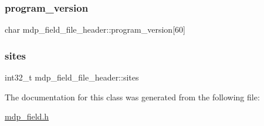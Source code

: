 \subsubsection{\texorpdfstring{program\+\_\+version}{program\_version}}
{\footnotesize\ttfamily char mdp\+\_\+field\+\_\+file\+\_\+header\+::program\+\_\+version\mbox{[}60\mbox{]}}

\mbox{\label{classmdp__field__file__header_a428a51466f48e613f85f9f9875a726bc}} 
\subsubsection{\texorpdfstring{sites}{sites}}
{\footnotesize\ttfamily int32\+\_\+t mdp\+\_\+field\+\_\+file\+\_\+header\+::sites}



The documentation for this class was generated from the following file\+:\begin{DoxyCompactItemize}
\item 
\hyperlink{mdp__field_8h}{mdp\+\_\+field.\+h}\end{DoxyCompactItemize}
